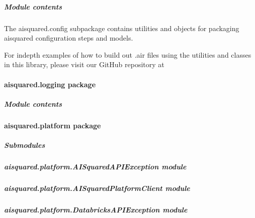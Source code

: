 \documentclass[letterpaper,10pt,english]{sphinxmanual}
\begin{document}
\subparagraph{Module contents}
\label{\detokenize{aisquared.config:module-aisquared.config}}\label{\detokenize{aisquared.config:module-contents}}
\sphinxAtStartPar
The aisquared.config subpackage contains utilities and objects for packaging aisquared configuration steps and models.

\sphinxAtStartPar
For in\sphinxhyphen{}depth examples of how to build out .air files using the utilities and classes in this library, please visit our
GitHub repository at 

\sphinxstepscope


\paragraph{aisquared.logging package}
\label{\detokenize{aisquared.logging:aisquared-logging-package}}\label{\detokenize{aisquared.logging::doc}}

\subparagraph{Module contents}
\label{\detokenize{aisquared.logging:module-contents}}
\sphinxstepscope


\paragraph{aisquared.platform package}
\label{\detokenize{aisquared.platform:aisquared-platform-package}}\label{\detokenize{aisquared.platform::doc}}

\subparagraph{Submodules}
\label{\detokenize{aisquared.platform:submodules}}

\subparagraph{aisquared.platform.AISquaredAPIException module}
\label{\detokenize{aisquared.platform:aisquared-platform-aisquaredapiexception-module}}

\subparagraph{aisquared.platform.AISquaredPlatformClient module}
\label{\detokenize{aisquared.platform:aisquared-platform-aisquaredplatformclient-module}}

\subparagraph{aisquared.platform.DatabricksAPIException module}
\label{\detokenize{aisquared.platform:module-aisquared.platform.DatabricksAPIException}}\label{\detokenize{aisquared.platform:aisquared-platform-databricksapiexception-module}}
\end{document}
